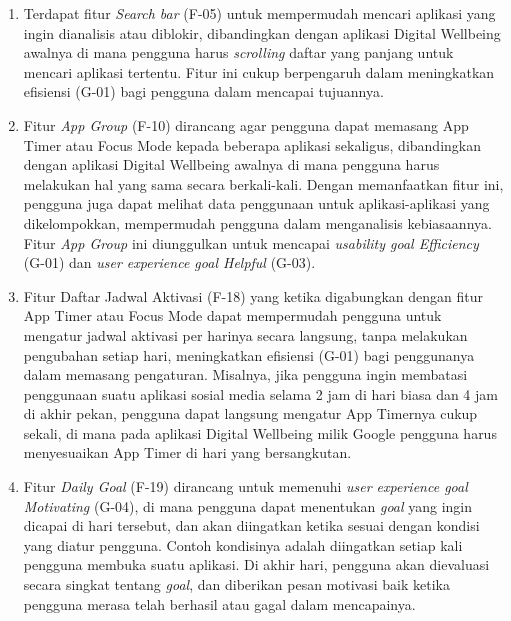 \begin{enumerate}
  \item Terdapat fitur \textit{Search bar} (F-05) untuk mempermudah mencari aplikasi yang ingin dianalisis atau diblokir, dibandingkan dengan aplikasi Digital Wellbeing awalnya di mana pengguna harus \textit{scrolling} daftar yang panjang untuk mencari aplikasi tertentu. Fitur ini cukup berpengaruh dalam meningkatkan efisiensi (G-01) bagi pengguna dalam mencapai tujuannya.
  
  \item Fitur \textit{App Group} (F-10) dirancang agar pengguna dapat memasang App Timer atau Focus Mode kepada beberapa aplikasi sekaligus, dibandingkan dengan aplikasi Digital Wellbeing awalnya di mana pengguna harus melakukan hal yang sama secara berkali-kali. Dengan memanfaatkan fitur ini, pengguna juga dapat melihat data penggunaan untuk aplikasi-aplikasi yang dikelompokkan, mempermudah pengguna dalam menganalisis kebiasaannya. Fitur \textit{App Group} ini diunggulkan untuk mencapai \textit{usability goal Efficiency} (G-01) dan \textit{user experience goal Helpful} (G-03). 
  
  \item Fitur Daftar Jadwal Aktivasi (F-18) yang ketika digabungkan dengan fitur App Timer atau Focus Mode dapat mempermudah pengguna untuk mengatur jadwal aktivasi per harinya secara langsung, tanpa melakukan pengubahan setiap hari, meningkatkan efisiensi (G-01) bagi penggunanya dalam memasang pengaturan.  Misalnya, jika pengguna ingin membatasi penggunaan suatu aplikasi sosial media selama 2 jam di hari biasa dan 4 jam di akhir pekan, pengguna dapat langsung mengatur App Timernya cukup sekali, di mana pada aplikasi Digital Wellbeing milik Google pengguna harus menyesuaikan App Timer di hari yang bersangkutan.
  
  \item Fitur \textit{Daily Goal} (F-19) dirancang untuk memenuhi \textit{user experience goal Motivating} (G-04), di mana pengguna dapat menentukan \textit{goal} yang ingin dicapai di hari tersebut, dan akan diingatkan ketika sesuai dengan kondisi yang diatur pengguna. Contoh kondisinya adalah diingatkan setiap kali pengguna membuka suatu aplikasi. Di akhir hari, pengguna akan dievaluasi secara singkat tentang \textit{goal}, dan diberikan pesan motivasi baik ketika pengguna merasa telah berhasil atau gagal dalam mencapainya.
\end{enumerate}



